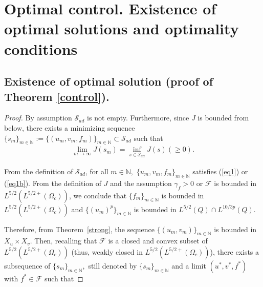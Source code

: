 \documentclass[11pt,reqno]{amsart}%
\numberwithin{equation}{section}
\begin{document}
{\section{Optimal control. Existence of optimal solutions and optimality conditions}
\subsection{Existence of optimal solution (proof of Theorem \ref{control}).} \label{Sec:OptimalSolution}
\begin{proof}
By assumption $\mathcal{S}_{ad}$ is not empty. Furthermore, since  $J$ is bounded from below, there exists a  minimizing sequence $\{s_m\}_{m\in\mathbb{N}}:=\{(u_m,v_m,f_m)\}_{m\in\mathbb{N}}\subset \mathcal{S}_{ad}$ such that
\begin{gather*}
    \lim_{m\to\infty}J(s_m)=\inf_{s\in \mathcal{S}_{ad}} J(s) (\ge 0).
\end{gather*}


From the definition of $\mathcal{S}_{ad}$, for all $m\in\mathbb{N},$ $\{u_m,v_m,f_m\}_{m\in\mathbb{N}}$ satisfies  (\ref{eq1}) or  (\ref{eq1b}). %
 From the definition of $J$ and  the assumption  $\gamma_f>0$ or $\mathcal{F}$ is bounded in 
$L^{5/2}(L^{5/2+}(\Omega_c))$, we conclude that $\{f_m\}_{m\in\mathbb{N}}$ is bounded in $L^{5/2}(L^{5/2+}(\Omega_c))$ and $\{(u_m)^p\}_{m\in\mathbb{N}}$ is bounded in $L^{5/2}(Q)\cap L^{10/3p}(Q).$ 

Therefore, from Theorem~\ref{strong}, 
the sequence $\{(u_m,v_m)\}_{m\in\mathbb{N}}$  is bounded in 
$X_u\times X_v$. 
Then, recalling that $\mathcal{F}$ is a closed and convex subset of $L^{5/2}(L^{5/2+}(\Omega_c))$
 (thus, weakly closed in $L^{5/2}(L^{5/2+}(\Omega_c))$),
  there exists a subsequence of $\{s_m\}_{m\in\mathbb{N}},$ still denoted by $\{s_m\}_{m\in\mathbb{N}}$ and a limit $(u^*,v^*,f^*)$ with $f^*\in\mathcal{F}$ such that


\end{proof}}
\end{document}
